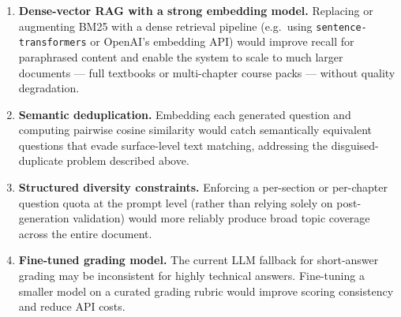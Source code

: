 \documentclass[12pt, a4paper]{article}
\begin{document}
\begin{enumerate}[leftmargin=1.5em, itemsep=0.3em]
  \item \textbf{Dense-vector RAG with a strong embedding model.}
    Replacing or augmenting BM25 with a dense retrieval pipeline (e.g.\ using \texttt{sentence-transformers} or OpenAI's embedding API) would improve recall for paraphrased content and enable the system to scale to much larger documents — full textbooks or multi-chapter course packs — without quality degradation.

  \item \textbf{Semantic deduplication.}
    Embedding each generated question and computing pairwise cosine similarity would catch semantically equivalent questions that evade surface-level text matching, addressing the disguised-duplicate problem described above.

  \item \textbf{Structured diversity constraints.}
    Enforcing a per-section or per-chapter question quota at the prompt level (rather than relying solely on post-generation validation) would more reliably produce broad topic coverage across the entire document.

  \item \textbf{Fine-tuned grading model.}
    The current LLM fallback for short-answer grading may be inconsistent for highly technical answers. Fine-tuning a smaller model on a curated grading rubric would improve scoring consistency and reduce API costs.
\end{enumerate}
\end{document}
